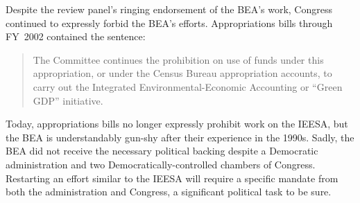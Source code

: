 Despite the review panel's ringing endorsement of the BEA's work,
Congress continued to expressly forbid the BEA's efforts.
Appropriations bills through FY~2002 contained the sentence:

\begin{quote}
	The Committee continues the prohibition on use of funds under this appropriation,
	or under the Census Bureau appropriation accounts,
	to carry out the Integrated Environmental-Economic Accounting or ``Green GDP'' initiative.
\end{quote}

Today, appropriations bills no longer expressly prohibit work on the IEESA,
but the BEA is understandably gun-shy after their experience in the 1990s.
Sadly, the BEA did not receive the necessary political backing
despite a Democratic administration
and two Democratically-controlled chambers of Congress.
Restarting an effort similar to the IEESA will require a specific
mandate from both the administration and Congress, 
a significant political task to be sure.

% 
% 
% 
% 

